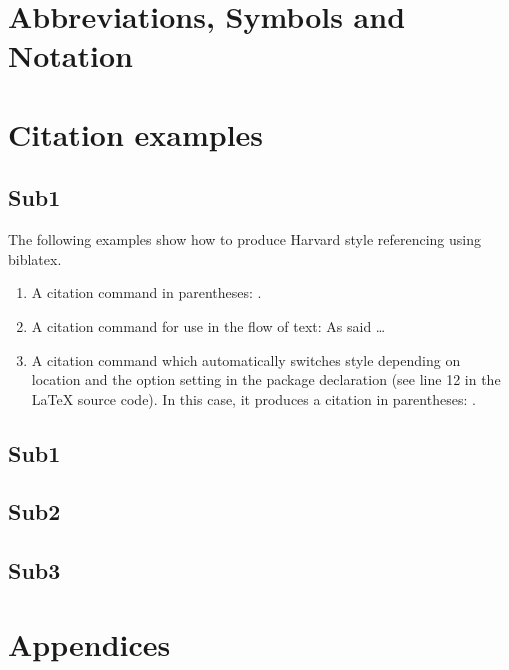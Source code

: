 \documentclass[a4paper, 12pt]{article}
\begin{document}
\pagebreak


\section{Abbreviations, Symbols and Notation}


\pagebreak


\section{Citation examples}
\subsection{Sub1}



The following examples show how to produce Harvard style referencing using biblatex.

\begin{enumerate}
\item A citation command in parentheses: \parencite{Smith:2012qr}.
\item A citation command for use in the flow of text: As \textcite{Smith:2013jd} said \dots
\item A citation command which automatically switches style depending on location and the option setting in the package declaration (see line 12 in the LaTeX source code). In this case, it produces a citation in parentheses: \autocite{Other:2014ab}.
\end{enumerate}


\subsection{Sub1}


\subsection{Sub2}


\subsection{Sub3}



\pagebreak


\section{Appendices}


\pagebreak


{} %
\printbibliography
\pagebreak


\end{document}
